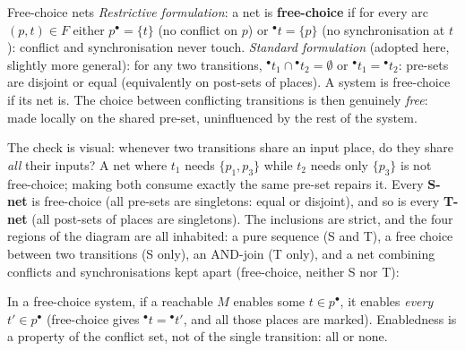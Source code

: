 \begin{definitionbox}{Free-choice nets}
\emph{Restrictive formulation}: a net is \textbf{free-choice} if for every arc $(p, t) \in F$ either $p^\bullet = \{t\}$ (no conflict on $p$) or ${}^\bullet t = \{p\}$ (no synchronisation at $t$): conflict and synchronisation never touch.
\emph{Standard formulation} (adopted here, slightly more general): for any two transitions, ${}^\bullet t_1 \cap {}^\bullet t_2 = \emptyset$ or ${}^\bullet t_1 = {}^\bullet t_2$: pre-sets are disjoint or equal (equivalently on post-sets of places). A system is free-choice if its net is. The choice between conflicting transitions is then genuinely \emph{free}: made locally on the shared pre-set, uninfluenced by the rest of the system.
\end{definitionbox}

The check is visual: whenever two transitions share an input place, do they share \emph{all} their inputs? A net where $t_1$ needs $\{p_1, p_3\}$ while $t_2$ needs only $\{p_3\}$ is not free-choice; making both consume exactly the same pre-set repairs it. Every \textbf{S-net} is free-choice (all pre-sets are singletons: equal or disjoint), and so is every \textbf{T-net} (all post-sets of places are singletons). The inclusions are strict, and the four regions of the diagram are all inhabited: a pure sequence (S and T), a free choice between two transitions (S only), an AND-join (T only), and a net combining conflicts and synchronisations kept apart (free-choice, neither S nor T):
\begin{center}
\end{center}

\begin{proposition}
In a free-choice system, if a reachable $M$ enables some $t \in p^\bullet$, it enables \emph{every} $t' \in p^\bullet$ (free-choice gives ${}^\bullet t = {}^\bullet t'$, and all those places are marked). Enabledness is a property of the conflict set, not of the single transition: all or none.
\end{proposition}

